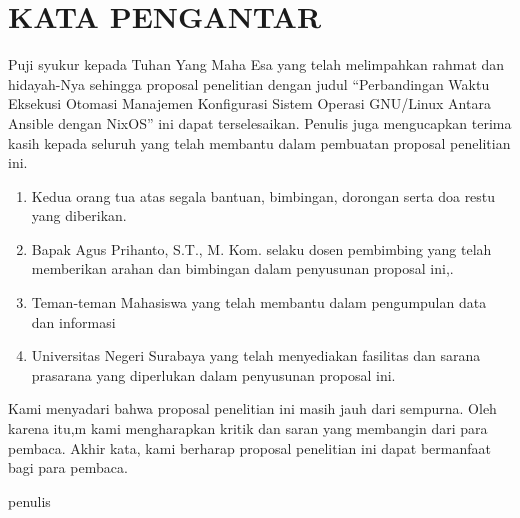 \documentclass[10pt,]{report}
\begin{document}

\chapter*{KATA PENGANTAR}
\begin{justify}
	Puji syukur kepada Tuhan Yang Maha Esa yang telah melimpahkan rahmat dan
	hidayah-Nya sehingga proposal penelitian dengan judul “Perbandingan
	Waktu Eksekusi Otomasi Manajemen Konfigurasi Sistem Operasi GNU/Linux Antara Ansible dengan NixOS” ini
	dapat terselesaikan. Penulis juga mengucapkan terima kasih kepada seluruh
	yang telah membantu dalam pembuatan proposal penelitian ini.
	\begin{enumerate}[leftmargin=0.45cm]
		\item Kedua orang tua atas segala bantuan, bimbingan, dorongan serta doa restu yang diberikan.
		\item Bapak Agus Prihanto, S.T., M. Kom. selaku dosen pembimbing yang telah memberikan arahan dan bimbingan dalam penyusunan proposal ini,.
		\item Teman-teman Mahasiswa yang telah membantu dalam pengumpulan data dan informasi
		\item Universitas Negeri Surabaya yang telah menyediakan fasilitas dan sarana prasarana yang diperlukan dalam penyusunan proposal ini.
	\end{enumerate}
	Kami menyadari bahwa proposal penelitian ini masih jauh dari sempurna. Oleh karena itu,m kami mengharapkan kritik dan saran yang membangin dari para pembaca.
	Akhir kata, kami berharap proposal penelitian ini dapat bermanfaat bagi para pembaca.
\end{justify}
\begin{FlushRight}
	penulis
\end{FlushRight}
\newpage
\end{document}
